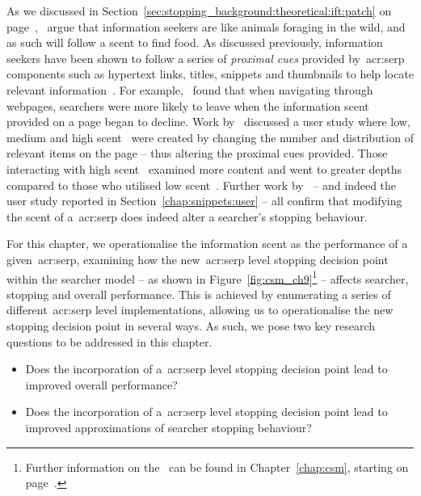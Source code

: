 As we discussed in Section~\ref{sec:stopping_background:theoretical:ift:patch} on page~\pageref{sec:stopping_background:theoretical:ift:patch},~\cite{pirolli1999ift} argue that information seekers are like animals foraging in the wild, and as such will follow a scent to find food. As discussed previously, information seekers have been shown to follow a series of \emph{proximal cues} provided by~\gls{acr:serp} components such as hypertext links, titles, snippets and thumbnails to help locate relevant information~\citep{pirolli1995ift, pirolli1999ift, chi2001information_scent, oltston2003scenttrails, pirolli2007ift}. For example,~\cite{card2001scent_graphs} found that when navigating through webpages, searchers were more likely to leave when the information scent provided on a page began to decline. Work by~\cite{wu2014information_scent} discussed a user study where low, medium and high scent~ were created by changing the number and distribution of relevant items on the page -- thus altering the proximal cues provided. Those interacting with high scent~ examined more content and went to greater depths compared to those who utilised low scent~. Further work by~\cite{ong2017scent_behaviour} -- and indeed the user study reported in Section~\ref{chap:snippets:user} -- all confirm that modifying the scent of a~\gls{acr:serp} does indeed alter a searcher's stopping behaviour.

For this chapter, we operationalise the information scent as the performance of a given~\gls{acr:serp}, examining how the new~\gls{acr:serp} level stopping decision point within the searcher model -- as shown in Figure~\ref{fig:csm_ch9}\footnote{Further information on the~ can be found in Chapter~\ref{chap:csm}, starting on page~\pageref{chap:csm}.} -- affects searcher, stopping and overall performance. This is achieved by enumerating a series of different~\gls{acr:serp} level implementations, allowing us to operationalise the new stopping decision point in several ways. As such, we pose two key research questions to be addressed in this chapter.

\begin{itemize}
    \item[]{ Does the incorporation of a~\gls{acr:serp} level stopping decision point lead to improved overall performance?}
    \item[]{ Does the incorporation of a~\gls{acr:serp} level stopping decision point lead to improved approximations of searcher stopping behaviour?}
\end{itemize}

